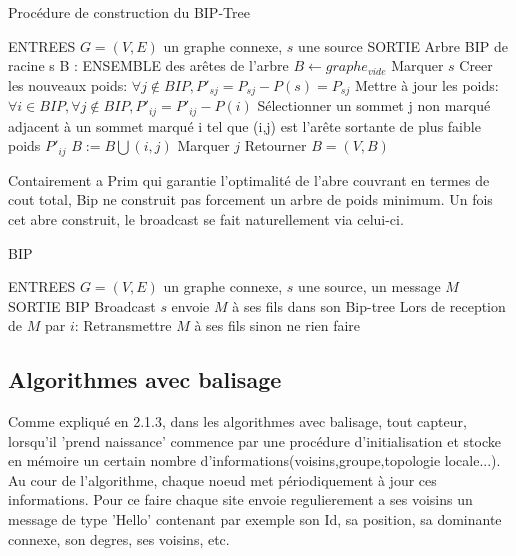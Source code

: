 \begin{algorithm}[h]
\caption{Procédure de construction du BIP-Tree}
\label{algo_BIP_tree}
\begin{algorithmic}
\STATE ENTREES  $G=(V,E)$ un graphe connexe, $s$ une source
\STATE SORTIE  Arbre BIP de racine s
\STATE B : ENSEMBLE des arêtes de l'arbre
\STATE  $B \leftarrow graphe_{vide}$
\STATE Marquer $s$
\STATE Creer les nouveaux poids: $\forall j \notin BIP, P'_{sj}=P_{sj}-P(s)=P_{sj}$
   \STATE Mettre à jour les poids:  $ \forall i \in BIP, \forall j \notin BIP, P'_{ij}=P'_{ij}-P(i)$
   \STATE Sélectionner un sommet j non marqué adjacent à un sommet marqué i tel que (i,j) est l'arête sortante de plus faible poids $P'_{ij}$
   \STATE $B := B\bigcup   {(i,j)}$
   \STATE Marquer $j$
\ENDWHILE
\STATE Retourner $B=(V,B)$
\end{algorithmic}
\end{algorithm}

Contairement a Prim qui garantie l'optimalité de l'abre couvrant en termes de cout total,
Bip ne construit pas forcement un arbre de poids minimum. Un fois cet abre construit, le broadcast se fait naturellement via celui-ci.

\begin{algorithm}[h]
\caption{BIP}
\label{algo_BIP}
\begin{algorithmic}
\STATE ENTREES  $G=(V,E)$ un graphe connexe, $s$ une source, un message $M$
\STATE SORTIE  BIP Broadcast
\STATE $s$ envoie $M$ à ses fils dans son Bip-tree
\STATE Lors de reception de $M$ par $i$:
    \STATE Retransmettre $M$ à ses fils sinon ne rien faire
\ENDIF
\end{algorithmic}
\end{algorithm}


\subsection{Algorithmes avec balisage}
Comme expliqué en 2.1.3, dans les algorithmes avec balisage, tout capteur, lorsqu'il 'prend naissance' commence par une procédure d'initialisation et stocke en 
mémoire un certain nombre d'informations(voisins,groupe,topologie locale...). Au cour de l'algorithme, chaque noeud met périodiquement à jour ces informations. Pour ce faire chaque site envoie regulierement a ses voisins un message de type
'Hello' contenant par exemple son Id, sa position, sa dominante connexe, son degres, ses voisins, etc.\\
